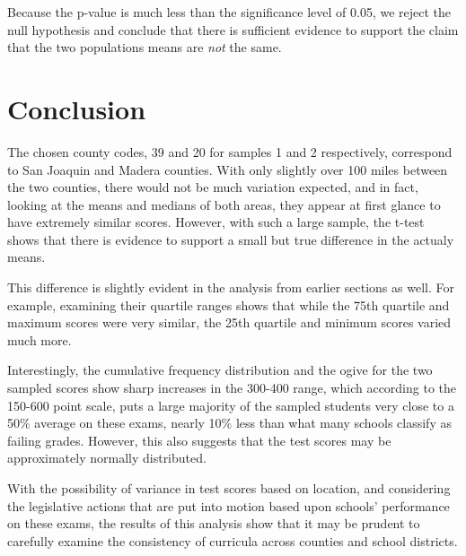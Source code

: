 \documentclass[twocolumn,english]{IEEEtran}
\theoremstyle{plain}
\theoremstyle{plain}
\begin{document}
Because the p-value is much less than the significance level of 0.05, we reject the null hypothesis and conclude that there is sufficient evidence to support the claim that the two populations means are \textit{not} the same.

\section{Conclusion}
The chosen county codes, 39 and 20 for samples 1 and 2 respectively, correspond to San Joaquin and Madera counties. With only slightly over 100 miles between the two counties, there would not be much variation expected, and in fact, looking at the means and medians of both areas, they appear at first glance to have extremely similar scores. However, with such a large sample, the t-test shows that there is evidence to support a small but true difference in the actualy means.

This difference is slightly evident in the analysis from earlier sections as well. For example, examining their quartile ranges shows that while the 75th quartile and maximum scores were very similar, the 25th quartile and minimum scores varied much more.

Interestingly, the cumulative frequency distribution and the ogive for the two sampled scores show sharp increases in the 300-400 range, which according to the 150-600 point scale, puts a large majority of the sampled students very close to a 50\% average on these exams, nearly 10\% less than what many schools classify as failing grades. However, this also suggests that the test scores may be approximately normally distributed.

With the possibility of variance in test scores based on location, and considering the legislative actions that are put into motion based upon schools' performance on these exams, the results of this analysis show that it may be prudent to carefully examine the consistency of curricula across counties and school districts.


%
%
\end{document}
